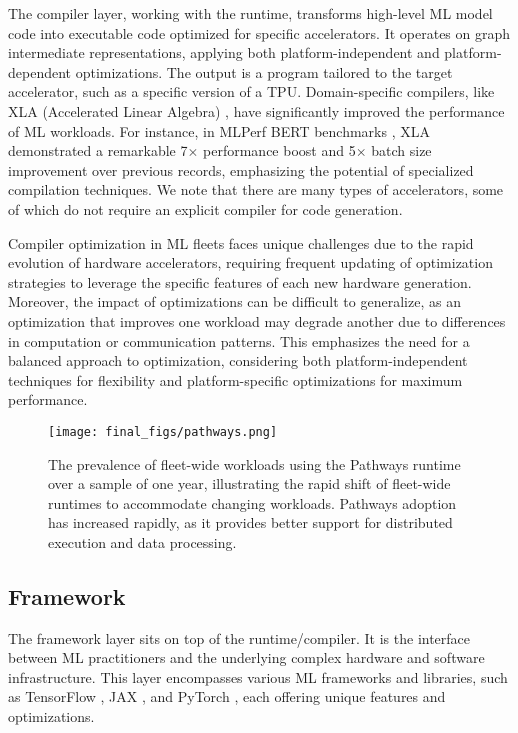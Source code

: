 The compiler layer, working with the runtime, transforms high-level ML model code into executable code optimized for specific accelerators. It operates on graph intermediate representations, applying both platform-independent and platform-dependent optimizations. The output is a program tailored to the target accelerator, such as a specific version of a TPU. Domain-specific compilers, like XLA (Accelerated Linear Algebra) \cite{xla}, have significantly improved the performance of ML workloads. For instance, in MLPerf BERT benchmarks \cite{mattson2020mlperf}, XLA demonstrated a remarkable 7$\times$ performance boost and 5$\times$ batch size improvement \cite{kumar2021exploring} over previous records, emphasizing the potential of specialized compilation techniques. We note that there are many types of accelerators, some of which do not require an explicit compiler for code generation. 

Compiler optimization in ML fleets faces unique challenges due to the rapid evolution of hardware accelerators, requiring frequent updating of optimization strategies to leverage the specific features of each new hardware generation. Moreover, the impact of optimizations can be difficult to generalize, as an optimization that improves one workload may degrade another due to differences in computation or communication patterns. This emphasizes the need for a balanced approach to optimization, considering both platform-independent techniques for flexibility and platform-specific optimizations for maximum performance.






\begin{figure}[t!]
    \centering
    \texttt{[image: final\_figs/pathways.png]}
    \caption{The prevalence of fleet-wide workloads using the Pathways runtime over a sample of one year, illustrating the rapid shift of fleet-wide runtimes to accommodate changing workloads. Pathways adoption has increased rapidly, as it provides better support for distributed execution and data processing.}
    \label{fig:pathways}
\end{figure}
\subsection{Framework}

The framework layer sits on top of the runtime/compiler. It is the interface between ML practitioners and the underlying complex hardware and software infrastructure. This layer encompasses various ML frameworks and libraries, such as TensorFlow \cite{abadi2016tensorflow}, JAX \cite{frostig2018compiling}, and PyTorch \cite{paszke2019pytorch}, each offering unique features and optimizations. 

